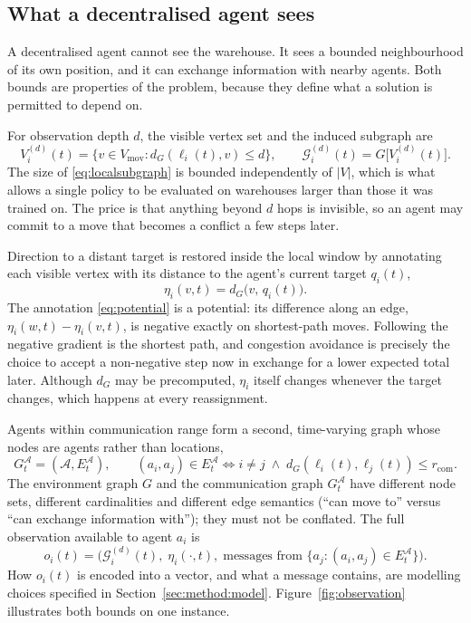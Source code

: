 \documentclass[../main.tex]{subfiles}
\begin{document}
\subsection{What a decentralised agent sees}
\label{sec:pf:observations}

A decentralised agent cannot see the warehouse. It sees a bounded neighbourhood
of its own position, and it can exchange information with nearby agents. Both
bounds are properties of the problem, because they define what a solution is
permitted to depend on.

For observation depth $d$, the visible vertex set and the induced subgraph are
\begin{equation}
  V^{(d)}_i(t) = \{ v \in V_{\mathrm{mov}} : d_G(\ell_i(t), v) \le d \},
  \qquad
  \mathcal{G}^{(d)}_i(t) = G\bigl[V^{(d)}_i(t)\bigr].
  \label{eq:localsubgraph}
\end{equation}
The size of \eqref{eq:localsubgraph} is bounded independently of $|V|$, which is
what allows a single policy to be evaluated on warehouses larger than those it
was trained on. The price is that anything beyond $d$ hops is invisible, so an
agent may commit to a move that becomes a conflict a few steps later.

Direction to a distant target is restored inside the local window by annotating
each visible vertex with its distance to the agent's current target $q_i(t)$,
\begin{equation}
  \eta_i(v,t) = d_G\bigl(v,\, q_i(t)\bigr).
  \label{eq:potential}
\end{equation}
The annotation \eqref{eq:potential} is a potential: its difference along an edge,
$\eta_i(w,t) - \eta_i(v,t)$, is negative exactly on shortest-path moves.
Following the negative gradient is the shortest path, and congestion avoidance is
precisely the choice to accept a non-negative step now in exchange for a lower
expected total later. Although $d_G$ may be precomputed, $\eta_i$ itself changes
whenever the target changes, which happens at every reassignment.

Agents within communication range form a second, time-varying graph whose nodes
are agents rather than locations,
\begin{equation}
  G^{\mathcal{A}}_t = (\mathcal{A}, E^{\mathcal{A}}_t), \qquad
  (a_i, a_j) \in E^{\mathcal{A}}_t \iff
  i \neq j \;\wedge\; d_G(\ell_i(t), \ell_j(t)) \le r_{\mathrm{com}} .
  \label{eq:commgraph}
\end{equation}
The environment graph $G$ and the communication graph $G^{\mathcal{A}}_t$ have
different node sets, different cardinalities and different edge semantics
(``can move to'' versus ``can exchange information with''); they must not be
conflated. The full observation available to agent $a_i$ is
\begin{equation}
  o_i(t) = \bigl( \mathcal{G}^{(d)}_i(t),\; \eta_i(\cdot, t),\;
                  \text{messages from } \{a_j : (a_i,a_j) \in E^{\mathcal{A}}_t\} \bigr).
  \label{eq:observation}
\end{equation}
How $o_i(t)$ is encoded into a vector, and what a message contains, are modelling
choices specified in Section~\ref{sec:method:model}.
Figure~\ref{fig:observation} illustrates both bounds on one instance.
\end{document}

